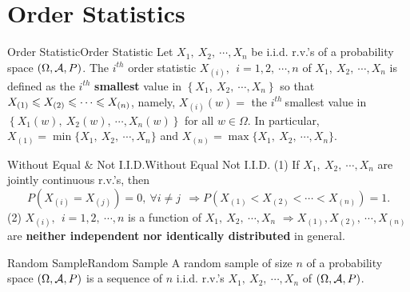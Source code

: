 \documentclass{elegantbook}
\begin{document}
\section{Order Statistics}

\begin{definition}{Order Statistic}{Order Statistic}
Let \(X_{1},\ X_{2},\ \cdots,X_{n}\) be i.i.d. r.v.'s of a probability space $(\Omega,\mathcal{A}, P)$. The \(i^{th}\) order statistic \(X_{(i)},\ \ i = 1,2,\ \cdots,n\)
of \(X_{1},\ X_{2},\ \cdots,X_{n}\) is defined as the \(i^{th}\)
\textbf{smallest} value in \(\left\{ X_{1},\ X_{2},\ \cdots,X_{n} \right\}\) so that
\(X_{(1)} \leqslant X_{(2)} \leqslant \cdots\leqslant X_{(n)}\), namely, \(X_{\left( i \right)}(w) =\) the \(i^{th}\ \)smallest value in \(\left\{ X_{1}(w),\ X_{2}(w),\ \cdots,X_{n}(w) \right\}\) for all \(w \in \Omega\). In particular,
\(X_{(1)} = \min\{ X_{1},\ X_{2},\ \cdots,X_{n}\}\) and \(X_{(n)} = \max\{ X_{1},\ X_{2},\ \cdots,X_{n}\}\).
\end{definition}

\begin{remark}{Without Equal $\&$ Not I.I.D.}{Without Equal Not I.I.D.}
(1) If \(X_{1},\ X_{2},\ \cdots,X_{n}\) are jointly continuous r.v.'s, then
\[P\left( X_{\left( i \right)} = X_{\left( j \right)} \right) = 0,\ \forall i \neq j\ \  \Rightarrow P\left( X_{\left( 1 \right)} < X_{\left( 2 \right)} < \cdots< X_{\left( n \right)} \right) = 1.\]
(2) \(X_{(i)},\ \ i = 1,2,\ \cdots,n\) is a function of \(X_{1},\ X_{2},\ \cdots,X_{n}\) \(\Rightarrow X_{(1)},X_{(2)},\ \cdots,X_{(n)}\) are \textbf{neither independent} \textbf{nor identically distributed} in general.
\end{remark}

\begin{definition}{Random Sample}{Random Sample}
A random sample of size $n$ of a probability space $(\Omega,\mathcal{A}, P)$ is a sequence of $n$ i.i.d. r.v.'s $X_1,\ X_2,\ \cdots,X_n$ of $(\Omega,\mathcal{A}, P)$.
\end{definition}
\end{document}
